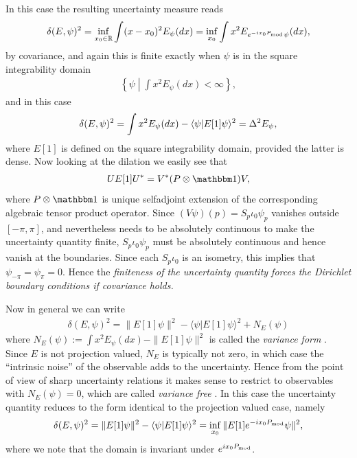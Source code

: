 In this case the resulting uncertainty measure reads
\begin{align}
  \delta(E,\psi)^2 = \inf_{x_0\in \mathbb R} \int (x-x_0)^2 E_\psi(dx) = \inf_{x_0}\int x^2 E_{e^{-ix_0P_{\mathrm{mod}}}\psi}(dx),
\end{align}
by covariance, and again this is finite exactly when $\psi$ is in the square integrability domain
\begin{align}
  \left\{ \psi\middle | \int x^2 E_{\psi}(dx) <\infty\right\},
\end{align}
and in this case
\begin{align}
  \delta(E,\psi)^2 = \int x^2 E_\psi(dx) - \langle \psi| E[1]\psi\rangle^2 = \var{E_\psi},
\end{align}
where $E[1]$ is defined on the square integrability domain, provided the latter is dense. Now looking at the dilation we easily see that
\begin{align}
  UE[1]U^* = V^*(P\otimes \id)V,
\end{align}
where $P\otimes \id$ is unique selfadjoint extension of the corresponding algebraic tensor product operator. Since $(V\psi)(p)= S_p\iota_0\psi_p$ vanishes outside $[-\pi,\pi]$, and nevertheless needs to be absolutely continuous to make the uncertainty quantity finite,  $S_p\iota_0\psi_p$ must be absolutely continuous and hence vanish at the boundaries. Since each $S_p\iota_0$ is an isometry, this implies that $\psi_{-\pi}=\psi_{\pi}=0$. Hence the \emph{finiteness of the uncertainty quantity forces the Dirichlet boundary conditions if covariance holds.}

Now in general we can write 
\begin{align}
  \delta(E,\psi)^2 = \|E[1]\psi\|^2 - \langle \psi| E[1]\psi\rangle^2 + N_E(\psi)
\end{align}
where $N_E(\psi) := \int x^2 E_\psi(dx) -\|E[1]\psi\|^2$ is called the \emph{variance form} \cite{werner-screen-obs-1986}. Since $E$ is not projection valued, $N_E$ is typically not zero, in which case the ``intrinsic noise'' of the observable adds to the uncertainty. Hence from the point of view of sharp uncertainty relations it makes sense to restrict to observables with $N_E(\psi)=0$, which are called \emph{variance free} \cite{}. In this case the uncertainty quantity reduces to the form identical to the projection valued case, namely
\begin{align}
  \delta(E,\psi)^2 = \|E[1]\psi\|^2 - \langle \psi| E[1]\psi\rangle^2 = \inf_{x_0} \| E[1]e^{-ix_0P_{\mathrm{mod}}}\psi\|^2,
\end{align}
where we note that the domain is invariant under $e^{ix_0P_{\mathrm{mod}}}$.

